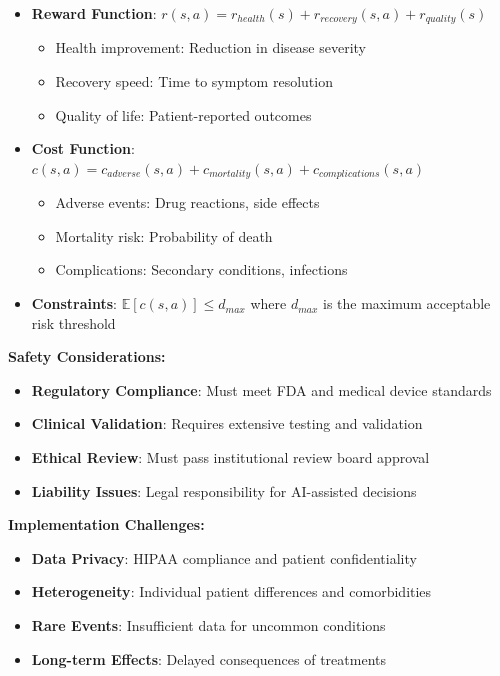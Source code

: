 \documentclass[12pt]{article}
\begin{document}
{{{{\begin{itemize}
\item \textbf{Reward Function}: $r(s,a) = r_{health}(s) + r_{recovery}(s,a) + r_{quality}(s)$
\begin{itemize}
\item Health improvement: Reduction in disease severity
\item Recovery speed: Time to symptom resolution
\item Quality of life: Patient-reported outcomes
\end{itemize}

\item \textbf{Cost Function}: $c(s,a) = c_{adverse}(s,a) + c_{mortality}(s,a) + c_{complications}(s,a)$
\begin{itemize}
\item Adverse events: Drug reactions, side effects
\item Mortality risk: Probability of death
\item Complications: Secondary conditions, infections
\end{itemize}

\item \textbf{Constraints}: $\mathbb{E}[c(s,a)] \leq d_{max}$ where $d_{max}$ is the maximum acceptable risk threshold
\end{itemize}

\textbf{Safety Considerations:}
\begin{itemize}
\item \textbf{Regulatory Compliance}: Must meet FDA and medical device standards
\item \textbf{Clinical Validation}: Requires extensive testing and validation
\item \textbf{Ethical Review}: Must pass institutional review board approval
\item \textbf{Liability Issues}: Legal responsibility for AI-assisted decisions
\end{itemize}

\textbf{Implementation Challenges:}
\begin{itemize}
\item \textbf{Data Privacy}: HIPAA compliance and patient confidentiality
\item \textbf{Heterogeneity}: Individual patient differences and comorbidities
\item \textbf{Rare Events}: Insufficient data for uncommon conditions
\item \textbf{Long-term Effects}: Delayed consequences of treatments
\end{itemize}

}}}}
\end{document}

